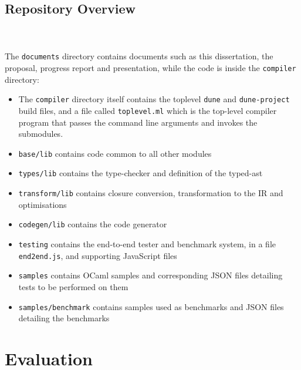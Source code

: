 \documentclass[12pt,twoside,notitlepage]{report}
\newcommand{\textinline}{\texttt}
\newcommand{\cfbox}[2]{%
	\colorlet{currentcolor}{.}%
	{\color{#1}%
		\fbox{\color{currentcolor}#2}}%
}
\newcommand\note[1]{\noindent\cfbox{blue}{\parbox{\textwidth}{\textcolor{blue}{#1}}}}
\begin{document}
\section{Repository Overview}
\begin{minipage}{\linewidth}
\end{minipage}
\\\\
The \textinline{documents} directory contains documents such as this dissertation, the proposal, progress report and presentation, while the code is inside the \textinline{compiler} directory:
\begin{itemize}
	\item The \textinline{compiler} directory itself contains the toplevel \textinline{dune} and \textinline{dune-project} build files, and a file called \textinline{toplevel.ml} which is the top-level compiler program that passes the command line arguments and invokes the submodules.
	\item \textinline{base/lib} contains code common to all other modules
	\item \textinline{types/lib} contains the type-checker and definition of the typed-ast
	\item \textinline{transform/lib} contains closure conversion, transformation to the IR and optimisations
	\item \textinline{codegen/lib} contains the code generator
	\item \textinline{testing} contains the end-to-end tester and benchmark system, in a file \textinline{end2end.js}, and supporting JavaScript files
	\item \textinline{samples} contains OCaml samples and corresponding JSON files detailing tests to be performed on them
	\item \textinline{samples/benchmark} contains samples used as benchmarks and JSON files detailing the benchmarks
\end{itemize}



\clearpage
\chapter{Evaluation}
\note{This is where Assessors will be looking for signs of success and for evidence of thorough and systematic evaluation as discussed in Section 8.3. Sample output, tables of timings and photographs of workstation screens, oscilloscope traces or circuit boards may be included. A graph that does not indicate confidence intervals will generally leave a professional scientist with a negative impression.}
\end{document}
